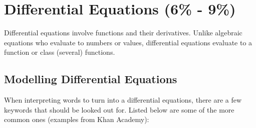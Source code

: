 \documentclass[12pt]{article}
\begin{document}
    \section{Differential Equations (6\% - 9\%)}
        Differential equations involve functions and their derivatives. Unlike algebraic equations who evaluate to numbers or values, differential equations evaluate to a function or class (several) functions.

        \subsection{Modelling Differential Equations}
            When interpreting words to turn into a differential equations, there are a few keywords that should be looked out for. Listed below are some of the more common ones (examples from Khan Academy):
\end{document}
